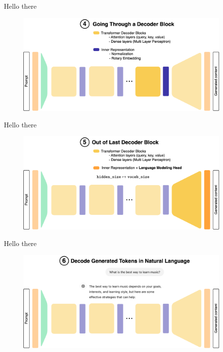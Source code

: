 \documentclass[11pt,aspectratio=169]{beamer}
\begin{document}
\begin{frame}{Hello there}
    \begin{figure}
        \centering
        \includegraphics[width=0.95\textwidth]{llm_7.png}
    \end{figure}
\end{frame}

\begin{frame}{Hello there}
    \begin{figure}
        \centering
        \includegraphics[width=0.95\textwidth]{llm_8.png}
    \end{figure}
\end{frame}

\begin{frame}{Hello there}
    \begin{figure}
        \centering
        \includegraphics[width=0.95\textwidth]{llm_9.png}
    \end{figure}
\end{frame}
\end{document}
